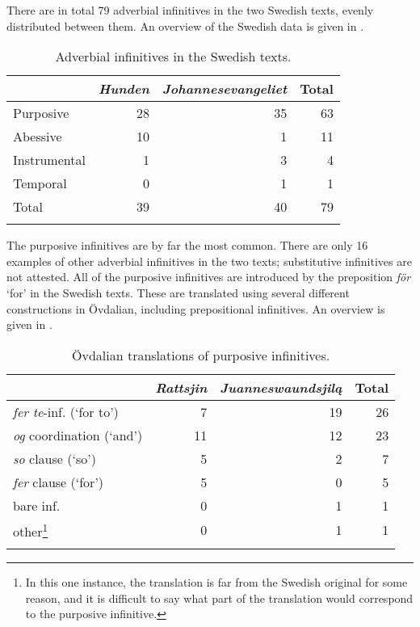 \documentclass[output=paper]{langscibook}
\begin{document}
There are in total 79 adverbial infinitives in the two Swedish texts, evenly distributed between them. An overview of the Swedish data is given in . 

\begin{table}
\caption{Adverbial infinitives in the Swedish texts.\label{tab:kalm:3}}
\begin{tabular}{lrrr} 
\lsptoprule
& \textit{Hunden} & \textit{Johannesevangeliet} & Total\\\midrule
Purposive & 28 & 35 & 63\\
Abessive & 10 & 1 & 11\\
Instrumental & 1 & 3 & 4\\
Temporal & 0 & 1 & 1\\
Total & 39 & 40 & 79\\
\lspbottomrule
\end{tabular}
\end{table}


The purposive infinitives are by far the most common. There are only 16 examples of other adverbial infinitives in the two texts; substitutive infinitives are not attested. All of the purposive infinitives are introduced by the preposition \textit{för} ‘for’ in the Swedish texts. These are translated using several different constructions in Övdalian, including prepositional infinitives. An overview is given in . 



\begin{table}
\caption{Övdalian translations of purposive infinitives.\label{tab:kalm:4}}
\begin{tabular}{lrrr} 
\lsptoprule
& \textit{Rattsjin} & \textit{Juanneswaundsjilą} & Total\\\midrule
\textit{fer te}{}-inf. (‘for to’) & 7 & 19 & 26\\
\textit{og} coordination (‘and’) & 11 & 12 & 23\\
\textit{so} clause (‘so’) & 5 & 2 & 7\\
\textit{fer} clause (‘for’) & 5 & 0 & 5\\
bare inf. & 0 & 1 & 1\\
other\footnote{In this one instance, the translation is far from the Swedish original for some reason, and it is difficult to say what part of the translation would correspond to the purposive infinitive.} & 0 & 1 & 1\\
\lspbottomrule
\end{tabular}
\end{table}
\end{document}
